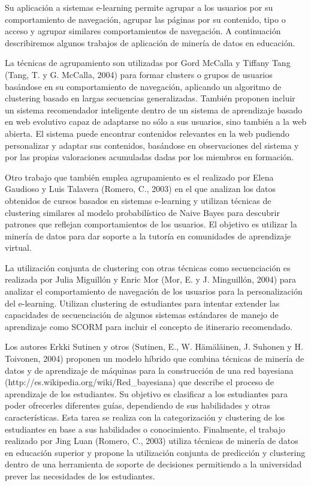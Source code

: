 \begin{itemize}
Su aplicación a sistemas e-learning permite agrupar a los usuarios por su
comportamiento de navegación, agrupar las páginas por su contenido, tipo o
acceso y agrupar similares comportamientos de navegación. A continuación
describiremos algunos trabajos de aplicación de minería de datos en educación.

La técnicas de agrupamiento son utilizadas por Gord McCalla y Tiffany
Tang (Tang, T. y G. McCalla, 2004) para formar clusters o grupos de usuarios
basándose en su comportamiento de navegación, aplicando un algoritmo de
clustering basado en largas secuencias generalizadas. También proponen incluir
un sistema recomendador inteligente dentro de un sistema de aprendizaje
basado en web evolutivo capaz de adaptarse no sólo a sus usuarios, sino también
a la web abierta. El sistema puede encontrar contenidos relevantes en la
web pudiendo personalizar y adaptar sus contenidos, basándose en observaciones
del sistema y por las propias valoraciones acumuladas dadas por los
miembros en formación.

Otro trabajo que también emplea agrupamiento es el realizado por Elena
Gaudioso y Luis Talavera (Romero, C., 2003) en el que analizan los datos
obtenidos de cursos basados en sistemas e-learning y utilizan técnicas de
clustering similares al modelo probabilístico de Naive Bayes para descubrir
patrones que reflejan comportamientos de los usuarios. El objetivo es utilizar
la minería de datos para dar soporte a la tutoría en comunidades de aprendizaje
virtual.

La utilización conjunta de clustering con otras técnicas como secuenciación es
realizada por Julia Miguillón y Enric Mor (Mor, E. y J. Minguillón, 2004) para
analizar el comportamiento de navegación de los usuarios para la personalización
del e-learning. Utilizan clustering de estudiantes para intentar extender las
capacidades de secuenciación de algunos sistemas estándares de manejo
de aprendizaje como SCORM para incluir el concepto de itinerario recomendado.

Los autores Erkki Sutinen y otros (Sutinen, E., W. Hämäläinen, J. Suhonen y H.
Toivonen, 2004) proponen un modelo híbrido que combina técnicas de minería de
datos y de aprendizaje de máquinas para la construcción de una red bayesiana
(http://es.wikipedia.org/wiki/Red\_bayesiana) que describe el proceso
de aprendizaje de los estudiantes. Su objetivo es clasificar a los estudiantes
para poder ofrecerles diferentes guías, dependiendo de sus habilidades y otras
características. Esta tarea se realiza con la categorización y clustering de los
estudiantes en base a sus habilidades o conocimiento. Finalmente, el
trabajo realizado por Jing Luan (Romero, C., 2003) utiliza técnicas de minería
de datos en educación superior y propone la utilización conjunta de predicción
y clustering dentro de una herramienta de soporte de decisiones permitiendo a 
la universidad prever las necesidades de los estudiantes.


\end{itemize}
